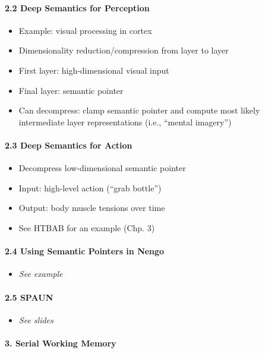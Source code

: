 \documentclass[10pt,letterpaper]{article}
\begin{document}
\paragraph{2.2 Deep Semantics for Perception}
\begin{itemize}
	\item Example: visual processing in cortex
	\item Dimensionality reduction/compression from layer to layer
	\item First layer: high-dimensional visual input
	\item Final layer: semantic pointer
	\item Can decompress: clamp semantic pointer and compute most likely intermediate layer representations (i.e., \enquote{mental imagery})
\end{itemize}

\paragraph{2.3 Deep Semantics for Action}

\begin{itemize}
	\item Decompress low-dimensional semantic pointer
	\item Input: high-level action (\enquote{grab bottle})
	\item Output: body muscle tensions over time
	\item See HTBAB for an example (Chp. 3)
\end{itemize}

\paragraph{2.4 Using Semantic Pointers in Nengo}

\begin{itemize}
	\item \emph{See example}
\end{itemize}

\paragraph{2.5 SPAUN}

\begin{itemize}
	\item \emph{See slides}
\end{itemize}

\paragraph{3. Serial Working Memory}
\end{document}
